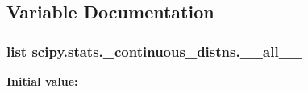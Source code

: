 \subsection{Variable Documentation}
\hypertarget{namespacescipy_1_1stats_1_1__continuous__distns_ac8928f4e05d766e795f8022a29c951d9}{}
\subsubsection[{\+\_\+\+\_\+all\+\_\+\+\_\+}]{\setlength{\rightskip}{0pt plus 5cm}list scipy.\+stats.\+\_\+continuous\+\_\+distns.\+\_\+\+\_\+all\+\_\+\+\_\+}\label{namespacescipy_1_1stats_1_1__continuous__distns_ac8928f4e05d766e795f8022a29c951d9}
{\bfseries Initial value\+:}
